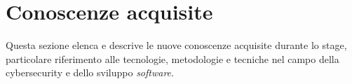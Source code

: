 \section{Conoscenze acquisite}
Questa sezione elenca e descrive le nuove conoscenze acquisite durante lo stage, particolare riferimento alle tecnologie, metodologie e tecniche nel campo della cybersecurity e dello sviluppo \textit{software}.